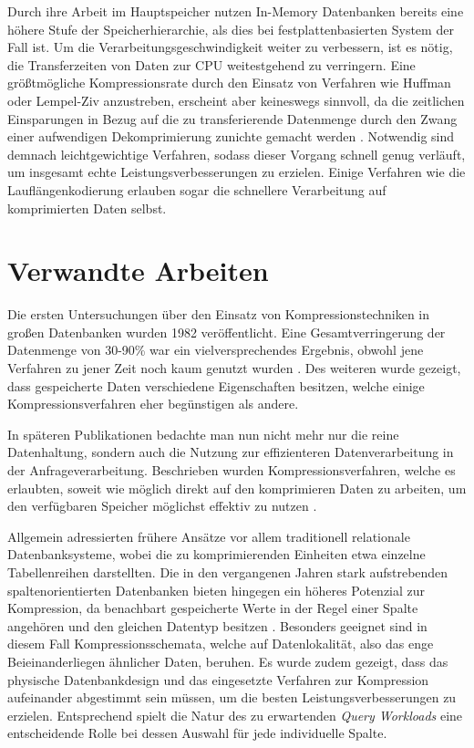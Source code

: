 Durch ihre Arbeit im Hauptspeicher nutzen In-Memory Datenbanken bereits eine höhere Stufe der Speicherhierarchie, als dies bei festplattenbasierten System der Fall ist. Um die Verarbeitungsgeschwindigkeit weiter zu verbessern, ist es nötig, die Transferzeiten von Daten zur \ac{CPU} weitestgehend zu verringern. Eine größtmögliche Kompressionsrate durch den Einsatz von Verfahren wie Huffman oder Lempel-Ziv anzustreben, erscheint aber keineswegs sinnvoll, da die zeitlichen Einsparungen in Bezug auf die zu transferierende Datenmenge durch den Zwang einer aufwendigen Dekomprimierung zunichte gemacht werden \cite{Abadi2006}. Notwendig sind demnach leichtgewichtige Verfahren, sodass dieser Vorgang schnell genug verläuft, um insgesamt echte Leistungsverbesserungen zu erzielen. Einige Verfahren wie die Lauflängenkodierung erlauben sogar die schnellere Verarbeitung auf komprimierten Daten selbst.

\section{Verwandte Arbeiten}

Die ersten Untersuchungen über den Einsatz von Kompressionstechniken in großen Datenbanken wurden 1982 veröffentlicht. Eine Gesamtverringerung der Datenmenge von 30-90\% war ein vielversprechendes Ergebnis, obwohl jene Verfahren zu jener Zeit noch kaum genutzt wurden \cite{Severance1982}. Des weiteren wurde gezeigt, dass gespeicherte Daten verschiedene Eigenschaften besitzen, welche einige Kompressionsverfahren eher begünstigen als andere.

In späteren Publikationen bedachte man nun nicht mehr nur die reine Datenhaltung, sondern auch die Nutzung zur effizienteren Datenverarbeitung in der Anfrageverarbeitung. Beschrieben wurden Kompressionsverfahren, welche es erlaubten, soweit wie möglich direkt auf den komprimieren Daten zu arbeiten, um den verfügbaren Speicher möglichst effektiv zu nutzen \cite{Graefe1991}.

Allgemein adressierten frühere Ansätze vor allem traditionell relationale Datenbanksysteme, wobei die zu komprimierenden Einheiten etwa einzelne Tabellenreihen darstellten. Die in den vergangenen Jahren stark aufstrebenden spaltenorientierten Datenbanken bieten hingegen ein höheres Potenzial zur Kompression, da benachbart gespeicherte Werte in der Regel einer Spalte angehören und den gleichen Datentyp besitzen \cite{Abadi2006}. Besonders geeignet sind in diesem Fall Kompressionsschemata, welche auf Datenlokalität, also das enge Beieinanderliegen ähnlicher Daten, beruhen. Es wurde zudem gezeigt, dass das physische Datenbankdesign und das eingesetzte Verfahren zur Kompression aufeinander abgestimmt sein müssen, um die besten Leistungsverbesserungen zu erzielen. Entsprechend spielt die Natur des zu erwartenden \textit{Query Workloads} eine entscheidende Rolle bei dessen Auswahl für jede individuelle Spalte.

